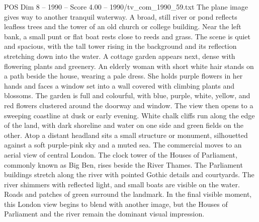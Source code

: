 \begin{textsample}{POS Dim 8 – 1990 – Score 4.00 – 1990/tv\_com\_1990\_59.txt}
The plane image gives way to another tranquil waterway.
A broad, still river or pond reflects leafless trees and the tower of an old church or college building.
Near the left bank, a small punt or flat boat rests close to reeds and grass.
The scene is quiet and spacious, with the tall tower rising in the background and its reflection stretching down into the water.
A cottage garden appears next, dense with flowering plants and greenery.
An elderly woman with short white hair stands on a path beside the house, wearing a pale dress.
She holds purple flowers in her hands and faces a window set into a wall covered with climbing plants and blossoms.
The garden is full and colourful, with blue, purple, white, yellow, and red flowers clustered around the doorway and window.
The view then opens to a sweeping coastline at dusk or early evening.
White chalk cliffs run along the edge of the land, with dark shoreline and water on one side and green fields on the other.
Atop a distant headland sits a small structure or monument, silhouetted against a soft purple-pink sky and a muted sea.
The commercial moves to an aerial view of central London.
The clock tower of the Houses of Parliament, commonly known as Big Ben, rises beside the River Thames.
The Parliament buildings stretch along the river with pointed Gothic details and courtyards.
The river shimmers with reflected light, and small boats are visible on the water.
Roads and patches of green surround the landmark.
In the final visible moment, this London view begins to blend with another image, but the Houses of Parliament and the river remain the dominant visual impression.

\end{textsample}
